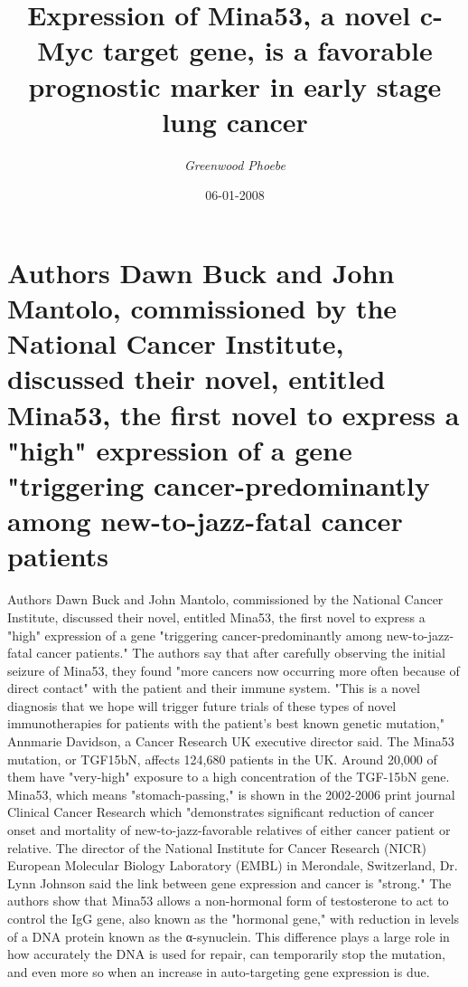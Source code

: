 \documentclass{article}%
\title{Expression of Mina53, a novel c{-}Myc target gene, is a favorable prognostic marker in early stage lung cancer}%
\author{\textit{Greenwood Phoebe}}%
\date{06-01-2008}%
\begin{document}
%
\normalsize%
\maketitle%
\section{Authors Dawn Buck and John Mantolo, commissioned by the National Cancer Institute, discussed their novel, entitled Mina53, the first novel to express a "high" expression of a gene "triggering cancer{-}predominantly among new{-}to{-}jazz{-}fatal cancer patients}%
\label{sec:AuthorsDawnBuckandJohnMantolo,commissionedbytheNationalCancerInstitute,discussedtheirnovel,entitledMina53,thefirstnoveltoexpressahighexpressionofagenetriggeringcancer{-}predominantlyamongnew{-}to{-}jazz{-}fatalcancerpatients}%
Authors Dawn Buck and John Mantolo, commissioned by the National Cancer Institute, discussed their novel, entitled Mina53, the first novel to express a "high" expression of a gene "triggering cancer{-}predominantly among new{-}to{-}jazz{-}fatal cancer patients."\newline%
The authors say that after carefully observing the initial seizure of Mina53, they found "more cancers now occurring more often because of direct contact" with the patient and their immune system.\newline%
"This is a novel diagnosis that we hope will trigger future trials of these types of novel immunotherapies for patients with the patient's best known genetic mutation," Annmarie Davidson, a Cancer Research UK executive director said.\newline%
The Mina53 mutation, or TGF15bN, affects 124,680 patients in the UK. Around 20,000 of them have "very{-}high" exposure to a high concentration of the TGF{-}15bN gene.\newline%
Mina53, which means "stomach{-}passing," is shown in the 2002{-}2006 print journal Clinical Cancer Research which "demonstrates significant reduction of cancer onset and mortality of new{-}to{-}jazz{-}favorable relatives of either cancer patient or relative.\newline%
The director of the National Institute for Cancer Research (NICR) European Molecular Biology Laboratory (EMBL) in Merondale, Switzerland, Dr. Lynn Johnson said the link between gene expression and cancer is "strong."\newline%
The authors show that Mina53 allows a non{-}hormonal form of testosterone to act to control the IgG gene, also known as the "hormonal gene," with reduction in levels of a DNA protein known as the α{-}synuclein. This difference plays a large role in how accurately the DNA is used for repair, can temporarily stop the mutation, and even more so when an increase in auto{-}targeting gene expression is due.\newline%
\end{document}
